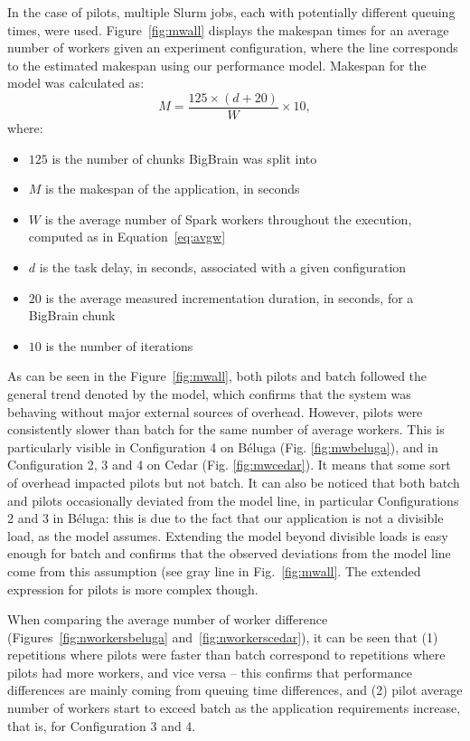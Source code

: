 \documentclass{IEEEtran}
\begin{document}
In the case of pilots, multiple Slurm jobs, each with potentially different queuing times,
were used. Figure~\ref{fig:mwall} displays the makespan times for an average number of workers
given an experiment configuration, where the line corresponds to the estimated makespan using 
our performance model. Makespan for the model was calculated as:
$$
M = \frac{125\times(d + 20)}{W}\times 10,
$$
where:
\begin{itemize}
    \item $125$ is the number of chunks BigBrain was split into
    \item $M$ is the makespan of the application, in seconds
    \item $W$ is the average number of Spark workers throughout the execution, computed as in Equation~\ref{eq:avgw}
    \item $d$ is the task delay, in seconds, associated with a given configuration
    \item $20$ is the average measured incrementation duration, in seconds, for a BigBrain chunk
    \item $10$ is the number of iterations
\end{itemize}
As can be seen in the Figure~\ref{fig:mwall}, both pilots and batch 
followed the general trend denoted by the model, which confirms that 
the system was behaving without major external sources of
overhead. However, pilots were consistently slower than batch for the same
number of average workers. This is particularly visible in Configuration 4
on B\'eluga (Fig. \ref{fig:mwbeluga}), and in Configuration 2, 3 and 4 on
Cedar (Fig. \ref{fig:mwcedar}). It means that some sort of overhead
impacted pilots but not batch. It can also be noticed that both batch and
pilots occasionally deviated from the model line, in particular
Configurations 2 and 3 in B\'eluga: this is due to the fact that our
application is not a divisible load, as the model assumes. Extending the
model beyond divisible loads is easy enough for batch and confirms that the
observed deviations from the model line come from this assumption (see gray
line in Fig.~\ref{fig:mwall}. The extended expression for pilots is more complex
though.

When
comparing the average number of worker difference
(Figures~\ref{fig:nworkersbeluga} and~\ref{fig:nworkerscedar}), it can be
seen that (1) repetitions where pilots were faster than batch correspond
to repetitions where pilots had more workers, and vice versa -- this
confirms that performance differences are mainly coming from queuing time
differences, and (2) pilot average number of workers start to exceed batch
as the application requirements increase, that is, for Configuration 3 and
4.
\end{document}
